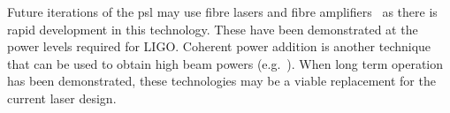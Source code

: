 \par
Future iterations of the \gls{psl} may use fibre lasers and fibre amplifiers~\cite{Buikema2019,Wellmann2019} as there is rapid development in this technology. These have been demonstrated at the power levels required for LIGO. Coherent power addition is another technique that can be used to obtain high beam powers (e.g.~\cite{Tuennermann2011,Wei2016}). When long term operation has been demonstrated, these technologies may be a viable replacement for the current laser design.